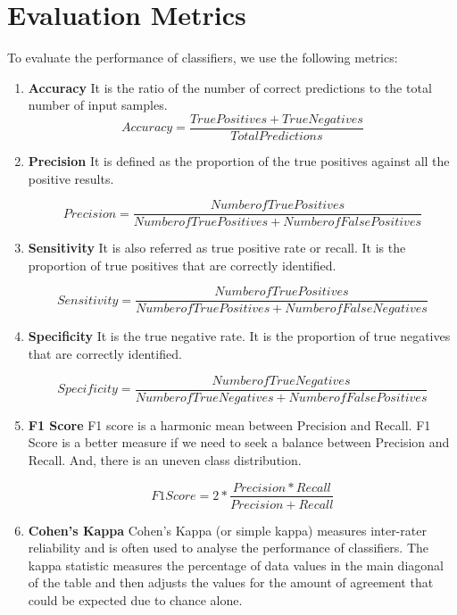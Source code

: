 \documentclass[]{article}
\begin{document}
\section{Evaluation Metrics}
\label{sec:metrics}

To evaluate the performance of classifiers, we use the following
metrics:

\begin{enumerate}
\item \textbf{Accuracy}
It is the ratio of the number of correct predictions to the total number of input samples.
\begin{equation}
Accuracy = \frac{True Positives + True Negatives} {Total Predictions}
\end{equation}

\item \textbf{Precision}
It is defined as the proportion of the true positives against all the positive
results.

\begin{equation}
Precision = \frac{Number of True Positives} {Number of True Positives + Number of False Positives}
\end{equation}

\item \textbf{Sensitivity}
It is also referred as true positive rate or recall. It is the proportion of true positives that are correctly identified.

\begin{equation}
Sensitivity = \frac{Number of True Positives} {Number of True Positives + Number of False Negatives}
\end{equation}


\item \textbf{Specificity}
It is the true negative rate. It is the proportion of true negatives that are
correctly identified.

\begin{equation}
Specificity = \frac{Number of True Negatives} {Number of True Negatives + Number of False Positives}
\end{equation}

\item \textbf{F1 Score}
F1 score is a harmonic mean between Precision and Recall. F1 Score is a better measure if we need to seek a balance between Precision and Recall. And, there is an uneven class distribution. 


\begin{equation}
F1 Score = 2 * \frac{Precision * Recall} {Precision + Recall}
\end{equation}

\item \textbf{Cohen's Kappa}
Cohen's Kappa (or simple kappa) measures inter-rater reliability and is often used to analyse the performance of classifiers. The kappa statistic measures the percentage of data values in the main diagonal of the table and then adjusts the values for the amount of agreement that could be expected due to chance alone.

\end{enumerate}
\end{document}
